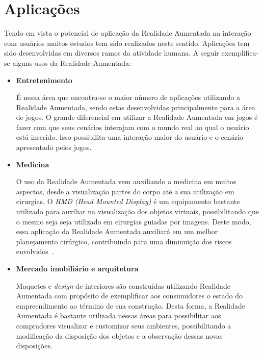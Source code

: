 \section{Aplicações}
\label{sec:aplicacoes}

	Tendo em vista o potencial de aplicação da Realidade Aumentada na interação com usuários muitos estudos tem
	sido realizados neste sentido. Aplicações tem sido desenvolvidas em diversos ramos da atividade humana. 
	A seguir exemplifica-se alguns usos da Realidade Aumentada:
	
	\begin{itemize}
	  \item \textbf{Entretenimento} 
	  
	  		É nessa área que encontra-se o maior número de aplicações utilizando a Realidade
	  		Aumentada, sendo estas desenvolvidas principalmente para a área de jogos. O grande
	  		diferencial em utilizar a Realidade Aumentada em jogos é fazer com que seus cenários interajam
	  		com o mundo real ao qual o usuário está inserido. Isso possibilita uma interação maior
	  		do usuário e o cenário apresentado pelos jogos. 
	  		
	  \item \textbf{Medicina} 
	  
	  		O uso da Realidade Aumentada vem auxiliando a medicina em muitos aspectos, desde a visualização
	  		partes do corpo até a sua utilização em cirurgias. O \textit{HMD (Head Mounted Display)} é um
	  		equipamento bastante utilizado para auxiliar na visualização dos objetos virtuais,
	  		possibilitando que o mesmo seja seja utilizado em cirurgias guiadas por imagens. Deste modo,
	  		essa aplicação da Realidade Aumentada auxiliará em um melhor planejamento cirúrgico,
	  		contribuindo para uma diminuição dos riscos envolvidos~\cite{suthau, nilsson}.
	
	  \item \textbf{Mercado imobiliário e arquitetura} 
	  
	  		Maquetes e \textit{design} de interiores são construídas utilizando Realidade Aumentada com
	  		propósito de exemplificar aos consumidores o estado do empreendimento ao término de sua
	  		construção. Desta forma, a Realidade Aumentada é bastante utilizada nessas áreas para
	  		possibilitar aos compradores visualizar e customizar seus ambientes, possibilitando a
	  		modificação da disposição dos objetos e a observação dessas novas disposições.


\end{itemize}
